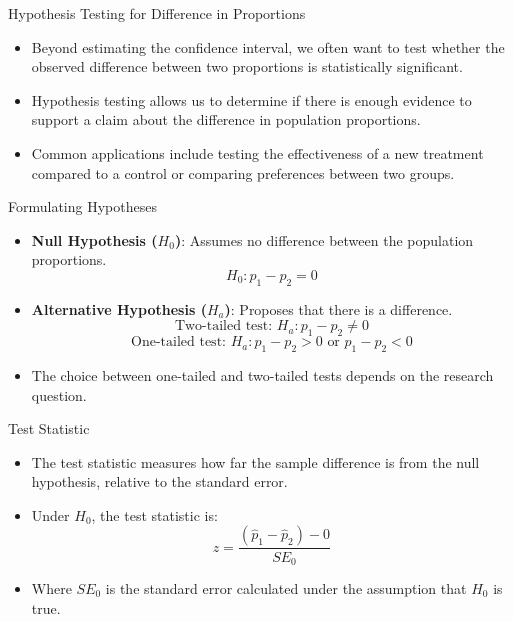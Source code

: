 \documentclass[handout]{beamer} %
\begin{document}
\begin{frame}{Hypothesis Testing for Difference in Proportions}
  \begin{itemize}
    \item Beyond estimating the confidence interval, we often want to test whether the observed difference between two proportions is statistically significant.
    \item Hypothesis testing allows us to determine if there is enough evidence to support a claim about the difference in population proportions.
    \item Common applications include testing the effectiveness of a new treatment compared to a control or comparing preferences between two groups.
  \end{itemize}
\end{frame}

\begin{frame}{Formulating Hypotheses}
  \begin{itemize}
    \item \textbf{Null Hypothesis ($H_0$)}: Assumes no difference between the population proportions.
    \[
    H_0: p_1 - p_2 = 0
    \]
    \item \textbf{Alternative Hypothesis ($H_a$)}: Proposes that there is a difference.
    \[
    \text{Two-tailed test: } H_a: p_1 - p_2 \neq 0
    \]
    \[
    \text{One-tailed test: } H_a: p_1 - p_2 > 0 \text{ or } p_1 - p_2 < 0
    \]
    \item The choice between one-tailed and two-tailed tests depends on the research question.
  \end{itemize}
\end{frame}

\begin{frame}{Test Statistic}
  \begin{itemize}
    \item The test statistic measures how far the sample difference is from the null hypothesis, relative to the standard error.
    \item Under $H_0$, the test statistic is:
    \[
    z = \frac{(\hat{p}_1 - \hat{p}_2) - 0}{SE_0}
    \]
    \item Where $SE_0$ is the standard error calculated under the assumption that $H_0$ is true.
  \end{itemize}
\end{frame}
\end{document}

